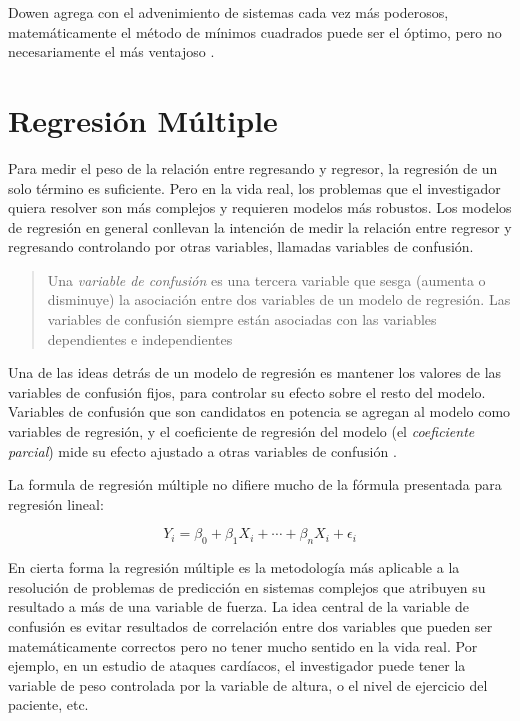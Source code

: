 \documentclass[letterpaper, spanish, 11pt]{report}
\begin{document}
Dowen agrega con el advenimiento de sistemas cada vez más poderosos, matemáticamente el método de mínimos cuadrados puede ser el óptimo, pero no necesariamente el más ventajoso \cite{thinkStats}. 

\section{Regresión Múltiple}
Para medir el peso de la relación entre regresando y regresor, la regresión de un solo término es suficiente. Pero en la vida real, los problemas que el investigador quiera resolver son más complejos y requieren modelos más robustos.  Los modelos de regresión en general conllevan la intención de medir la relación entre regresor y regresando controlando por otras variables, llamadas variables de confusión. 

\begin{quotation}
	Una \emph{variable de confusión} es una tercera variable que sesga (aumenta o disminuye) la asociación entre dos variables de un modelo de regresión. Las variables de confusión siempre están asociadas con las variables dependientes e independientes \cite{daroczi}
\end{quotation}

Una de las ideas detrás de un modelo de regresión es mantener los valores de las variables de confusión fijos, para controlar su efecto sobre el resto del modelo. Variables de confusión que son candidatos en potencia se agregan al modelo como variables de regresión, y el coeficiente de regresión del modelo (el \emph{coeficiente parcial}) mide su efecto ajustado a otras variables de confusión \cite{daroczi}. 

La formula de regresión múltiple no difiere mucho de la fórmula presentada para regresión lineal:

\begin{equation}
Y_{i} = \beta_{0} + \beta_{1}X_{i} + \cdots + \beta_{n}X_{i} + \epsilon_{i}
\end{equation}

En cierta forma la regresión múltiple es la metodología más aplicable a la resolución de problemas de predicción en sistemas complejos que atribuyen su resultado a más de una variable de fuerza. La idea central de la variable de confusión es evitar resultados de correlación entre dos variables que pueden ser matemáticamente correctos pero no tener mucho sentido en la vida real. Por ejemplo, en un estudio de ataques cardíacos, el investigador puede tener la variable de peso controlada por la variable de altura, o el nivel de ejercicio del paciente, etc. 
\end{document}
